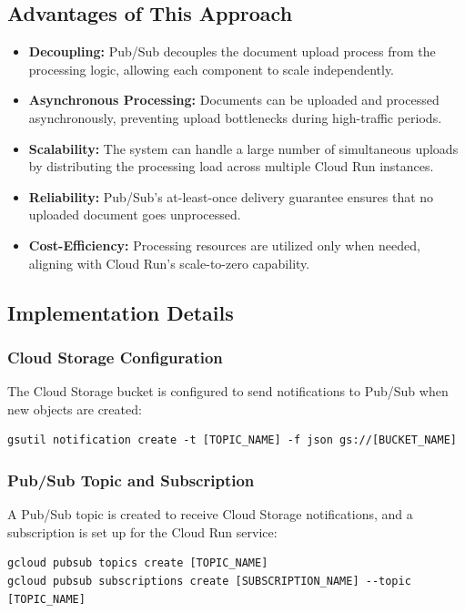 \documentclass[a4paper, 12pt]{report}
\begin{document}
\subsection{Advantages of This Approach}

\begin{itemize}
    \item \textbf{Decoupling:} Pub/Sub decouples the document upload process from the processing logic, allowing each component to scale independently.
    \item \textbf{Asynchronous Processing:} Documents can be uploaded and processed asynchronously, preventing upload bottlenecks during high-traffic periods.
    \item \textbf{Scalability:} The system can handle a large number of simultaneous uploads by distributing the processing load across multiple Cloud Run instances.
    \item \textbf{Reliability:} Pub/Sub's at-least-once delivery guarantee ensures that no uploaded document goes unprocessed.
    \item \textbf{Cost-Efficiency:} Processing resources are utilized only when needed, aligning with Cloud Run's scale-to-zero capability.
\end{itemize}

\subsection{Implementation Details}

\subsubsection{Cloud Storage Configuration}
The Cloud Storage bucket is configured to send notifications to Pub/Sub when new objects are created:

\begin{verbatim}
gsutil notification create -t [TOPIC_NAME] -f json gs://[BUCKET_NAME]
\end{verbatim}

\subsubsection{Pub/Sub Topic and Subscription}
A Pub/Sub topic is created to receive Cloud Storage notifications, and a subscription is set up for the Cloud Run service:

\begin{verbatim}
gcloud pubsub topics create [TOPIC_NAME]
gcloud pubsub subscriptions create [SUBSCRIPTION_NAME] --topic [TOPIC_NAME]
\end{verbatim}
\end{document}
